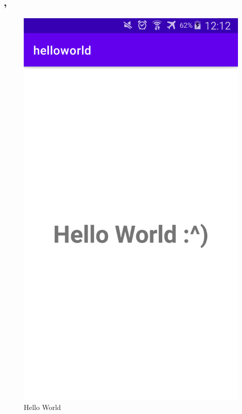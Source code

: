 \subsection*{\weekday, \day}

\begingroup
\setlength{\intextsep}{10pt}
\setlength{\columnsep}{15pt}

\begin{figure}
\centering
\includegraphics[scale=.15]{media/hello-world-app-noah-screenshot}
\caption{Hello World}
\end{figure}

